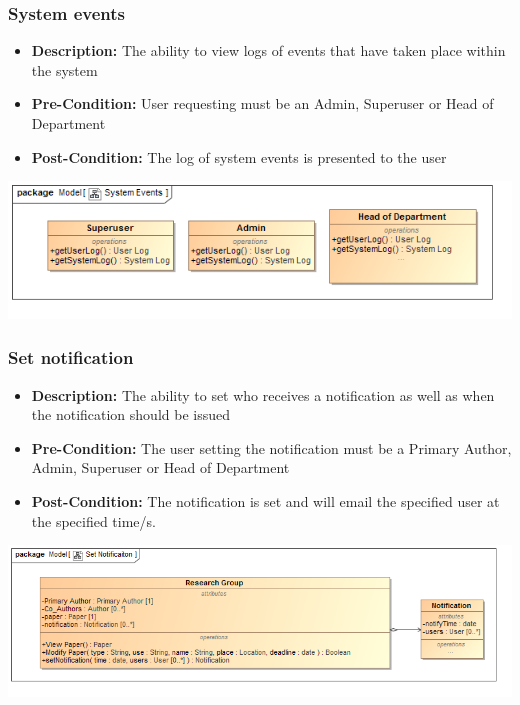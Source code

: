 \documentclass[11pt]{article}
\begin{document}
		\subsubsection{System events}
		\begin{itemize}
			\item \textbf{Description: }The ability to view logs of events that have taken place within the system
			\item \textbf{Pre-Condition: }User requesting must be an Admin, Superuser or Head of Department
			\item \textbf{Post-Condition: }The log of system events is presented to the user
		\end{itemize}
		\begin{center}
			\includegraphics[width=\textwidth]{../Diagrams/DomainModel/SystemEvents.png}\\[0.5cm]
		\end{center}
		\newpage
		\subsubsection{Set notification}
		\begin{itemize}
			\item \textbf{Description: }The ability to set who receives a notification as well as when the notification should be issued
			\item \textbf{Pre-Condition: }The user setting the notification must be a Primary Author, Admin, Superuser or Head of Department
			\item \textbf{Post-Condition: }The notification is set and will email the specified user at the specified time/s.
		\end{itemize}
		\begin{center}
			\includegraphics[width=\textwidth]{../Diagrams/DomainModel/SetNotificaiton.png}\\[0.5cm]
		\end{center}
		\newpage
\end{document}
